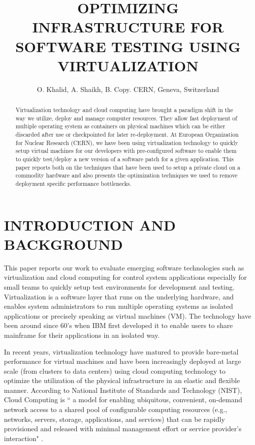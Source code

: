 \documentclass[acus]{JAC2003}
\begin{document}
\title{OPTIMIZING INFRASTRUCTURE FOR SOFTWARE TESTING USING VIRTUALIZATION}
\author{O. Khalid, A. Shaikh, B. Copy. CERN, Geneva, Switzerland}
\maketitle

\begin{abstract}
 Virtualization technology and cloud computing have brought a paradigm shift in the way we utilize, deploy and manage computer resources. They allow fast deployment of multiple operating system as containers on physical machines which can be either discarded after use or checkpointed for later re-deployment. At European Organization for Nuclear Research (CERN), we have been using virtualization technology to quickly setup virtual machines for our developers with pre-configured software to enable them to quickly test/deploy a new version of a software patch for a given application. This paper reports both on the techniques that have been used to setup a private cloud on a commodity hardware and also presents the optimization techniques we used to remove deployment specific performance bottlenecks.
\end{abstract}

\section{INTRODUCTION AND BACKGROUND}
This paper reports our work to evaluate emerging software technologies such as virtualization and cloud computing for control system applications especially for small teams to quickly setup test environments for development and testing. Virtualization is a software layer that runs on the underlying hardware, and enables system administrators to run multiple operating systems as isolated applications or precisely speaking as virtual machines (VM). The technology have been around since 60's when IBM first developed it to enable users to share mainframe for their applications in an isolated way.

In recent years, virtualization technology have matured to provide bare-metal performance for virtual machines and have been increasingly deployed at large scale (from clusters to data centers) using cloud computing technology to optimize the utilization of the physical infrastructure in an elastic and flexible manner. According to National Institute of Standards and Technology (NIST), Cloud Computing is `` a model for enabling ubiquitous, convenient, on-demand network access to a shared pool of configurable computing resources (e.g., networks, servers, storage, applications, and services) that can be rapidly provisioned and released with minimal management effort or service provider's interaction" \cite{nist}.
\end{document}
